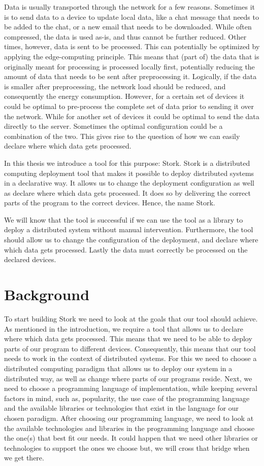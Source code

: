 \documentclass[a4paper]{article}
\begin{document}
Data is usually transported through the network for a few reasons. Sometimes it is to send data to a device to update local data, like a chat message that needs to be added to the chat, or a new email that needs to be downloaded. While often compressed, the data is used as-is, and thus cannot be further reduced. Other times, however, data is sent to be processed. This can potentially be optimized by applying the edge-computing principle. This means that (part of) the data that is originally meant for processing is processed locally first, potentially reducing the amount of data that needs to be sent after preprocessing it. Logically, if the data is smaller after preprocessing, the network load should be reduced, and consequently the energy consumption. However, for a certain set of devices it could be optimal to pre-process the complete set of data prior to sending it over the network. While for another set of devices it could be optimal to send the data directly to the server. Sometimes the optimal configuration could be a combination of the two. This gives rise to the question of how we can easily declare where which data gets processed.

In this thesis we introduce a tool for this purpose: Stork. Stork is a distributed computing deployment tool that makes it possible to deploy distributed systems in a declarative way. It allows us to change the deployment configuration as well as declare where which data gets processed. It does so by delivering the correct parts of the program to the correct devices. Hence, the name Stork.

We will know that the tool is successful if we can use the tool as a library to deploy a distributed system without manual intervention. Furthermore, the tool should allow us to change the configuration of the deployment, and declare where which data gets processed. Lastly the data must correctly be processed on the declared devices.
\section{Background}
To start building Stork we need to look at the goals that our tool should achieve. As mentioned in the introduction, we require a tool that allows us to declare where which data gets processed. This means that we need to be able to deploy parts of our program to different devices. Consequently, this means that our tool needs to work in the context of distributed systems. For this we need to choose a distributed computing paradigm that allows us to deploy our system in a distributed way, as well as change where parts of our programs reside.
Next, we need to choose a programming language of implementation, while keeping several factors in mind, such as, popularity, the use case of the programming language and the available libraries or technologies that exist in the language for our chosen paradigm.
After choosing our programming language, we need to look at the available technologies and libraries in the programming language and choose the one(s) that best fit our needs. It could happen that we need other libraries or technologies to support the ones we choose but, we will cross that bridge when we get there.
\end{document}
